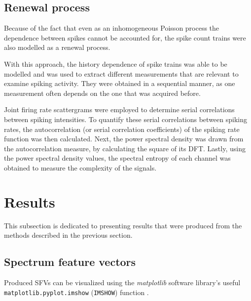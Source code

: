 \documentclass{article}
\begin{document}
\subsection{Renewal process}\label{RP Method}

Because of the fact that even as an inhomogeneous Poisson process the dependence between spikes cannot be accounted for, the spike count trains were also modelled as a renewal process.

With this approach, the history dependence of spike trains was able to be modelled and was used to extract different measurements that are relevant to examine spiking activity. 
They were obtained in a sequential manner, as one measurement often depends on the one that was acquired before.

Joint firing rate scattergrams were employed to determine serial correlations between spiking intensities. 
To quantify these serial correlations between spiking rates, the autocorrelation (or serial correlation coefficients) of the spiking rate function was then calculated. 
Next, the power spectral density was drawn from the autocorrelation measure, by calculating the square of its DFT. 
Lastly, using the power spectral density values, the spectral entropy of each channel was obtained to measure the complexity of the signals.

\newpage
\section{Results}

This subsection is dedicated to presenting results that were produced from the methods described in the previous section.

\subsection{Spectrum feature vectors}\label{SFV Results}
Produced SFVs can be visualized using the \textit{matplotlib} software library's useful \texttt{matplotlib.pyplot.imshow} (\texttt{IMSHOW}) function \citep{MPL}.
\end{document}
